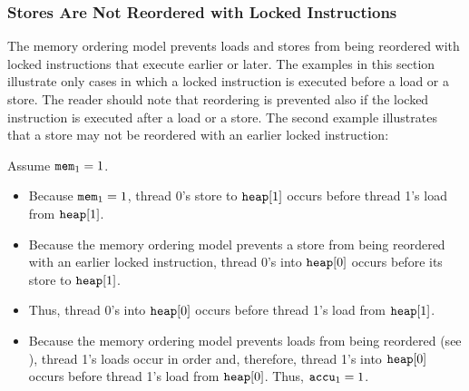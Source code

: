 \newpage

\subsubsection*{Stores Are Not Reordered with Locked Instructions}

The memory ordering model prevents loads and stores from being reordered with locked instructions that execute earlier or later.
The examples in this section illustrate only cases in which a locked instruction is executed before a load or a store.
The reader should note that reordering is prevented also if the locked instruction is executed after a load or a store.
\bigbreak
\noindent
The second example illustrates that a store may not be reordered with an earlier locked instruction:

\begin{table}[!hbt]
\noindent{}
\caption[Stores Are not Reordered with Locks]{Stores Are not Reordered with Locks \cite[Example 8-10]{ref:Intel}}
\label{tbl:litmus:intel:10}
\end{table}

\noindent
Assume $\texttt{mem}_1 = 1$.
\begin{itemize}
  \item Because $\texttt{mem}_1 = 1$, thread 0’s store to $\texttt{heap}[1]$ occurs before thread 1’s load from $\texttt{heap}[1]$.
  \item Because the memory ordering model prevents a store from being reordered with an earlier locked instruction, thread 0’s  into $\texttt{heap}[0]$ occurs before its store to $\texttt{heap}[1]$.
  \item Thus, thread 0’s  into $\texttt{heap}[0]$ occurs before thread 1’s load from $\texttt{heap}[1]$.
  \item Because the memory ordering model prevents loads from being reordered (see \cite[Section 8.2.3.2]{ref:Intel}), thread 1’s loads occur in order and, therefore, thread 1’s  into $\texttt{heap}[0]$ occurs before thread 1’s load from $\texttt{heap}[0]$. Thus, $\texttt{accu}_1 = 1$.
\end{itemize}

